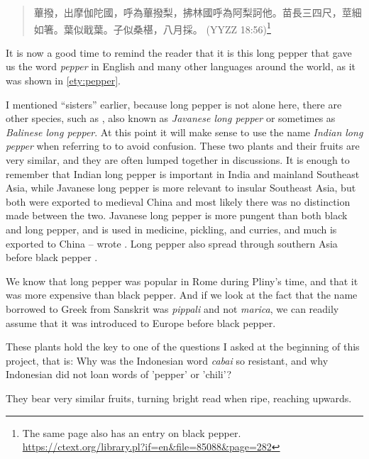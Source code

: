 \begin{quote}
    蓽撥，出摩伽陀國，呼為蓽撥梨，拂林國呼為阿梨訶他。苗長三四尺，莖細如箸。葉似戢葉。子似桑椹，八月採。 (\gls{YYZZ} 18:56)\footnote{The same page also has an entry on black pepper. \url{https://ctext.org/library.pl?if=en&file=85088&page=282}}
\end{quote}


It is now a good time to remind the reader that it is this long pepper that gave us the word \textit{pepper} in English and many other languages around the world, as it was shown in \ref{ety:pepper}. 

I mentioned ``sisters'' earlier, because long pepper is not alone here, there are other species, such as , also known as \textit{Javanese long pepper} or sometimes as \textit{Balinese long pepper}. At this point it will make sense to use the name \textit{Indian long pepper} when referring to  to avoid confusion. These two plants and their fruits are very similar, and they are often lumped together in discussions. It is enough to remember that Indian long pepper is important in India and mainland Southeast Asia, while Javanese long pepper is more relevant to insular Southeast Asia, but both were exported to medieval China and most likely there was no distinction made between the two. Javanese long pepper is more pungent than both black and long pepper, and is used in medicine, pickling, and curries, and much is exported to China -- wrote \textcite{burkill_dictionary_1935}. Long pepper also spread through southern Asia before black pepper \parencite[1746-1751]{burkill_dictionary_1935}. 

We know that long pepper was popular in Rome during Pliny's time, and that it was more expensive than black pepper. And if we look at the fact that the name borrowed to Greek from Sanskrit was \textit{pippali} and not \textit{marica}, we can readily assume that it was introduced to Europe before black pepper.

These plants hold the key to one of the questions I asked at the beginning of this project, that is: Why was the Indonesian word \textit{cabai} so resistant, and why Indonesian did not loan words of 'pepper' or 'chili'?  

They bear very similar fruits, turning bright read when ripe, reaching upwards.  


